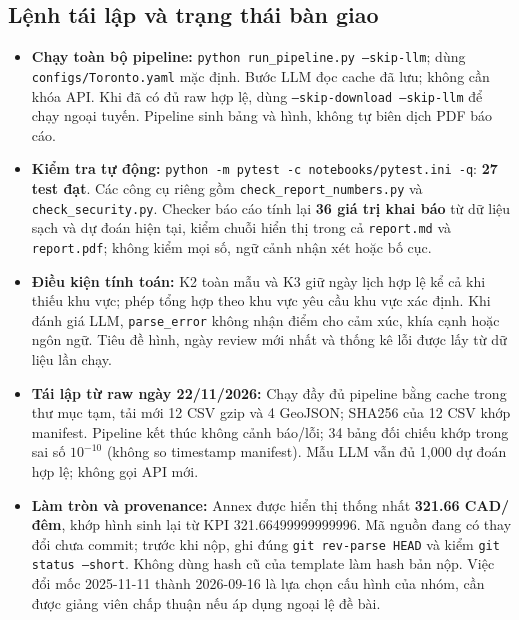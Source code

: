 \clearpage
\subsection{Lệnh tái lập và trạng thái bàn giao}

\begin{itemize}
\item \textbf{Chạy toàn bộ pipeline:} \texttt{python run\_pipeline.py --skip-llm}; dùng \texttt{configs/Toronto.yaml} mặc định. Bước LLM đọc cache đã lưu; không cần khóa API. Khi đã có đủ raw hợp lệ, dùng \texttt{--skip-download --skip-llm} để chạy ngoại tuyến. Pipeline sinh bảng và hình, không tự biên dịch PDF báo cáo.
\item \textbf{Kiểm tra tự động:} \texttt{python -m pytest -c notebooks/pytest.ini -q}: \textbf{27 test đạt}. Các công cụ riêng gồm \texttt{check\_report\_numbers.py} và \texttt{check\_security.py}. Checker báo cáo tính lại \textbf{36 giá trị khai báo} từ dữ liệu sạch và dự đoán hiện tại, kiểm chuỗi hiển thị trong cả \texttt{report.md} và \texttt{report.pdf}; không kiểm mọi số, ngữ cảnh nhận xét hoặc bố cục.
\item \textbf{Điều kiện tính toán:} K2 toàn mẫu và K3 giữ ngày lịch hợp lệ kể cả khi thiếu khu vực; phép tổng hợp theo khu vực yêu cầu khu vực xác định. Khi đánh giá LLM, \texttt{parse\_error} không nhận điểm cho cảm xúc, khía cạnh hoặc ngôn ngữ. Tiêu đề hình, ngày review mới nhất và thống kê lỗi được lấy từ dữ liệu lần chạy.
\item \textbf{Tái lập từ raw ngày 22/11/2026:} Chạy đầy đủ pipeline bằng cache trong thư mục tạm, tải mới 12 CSV gzip và 4 GeoJSON; SHA256 của 12 CSV khớp manifest. Pipeline kết thúc không cảnh báo/lỗi; 34 bảng đối chiếu khớp trong sai số $10^{-10}$ (không so timestamp manifest). Mẫu LLM vẫn đủ 1,000 dự đoán hợp lệ; không gọi API mới.
\item \textbf{Làm tròn và provenance:} Annex được hiển thị thống nhất \textbf{321.66 CAD/đêm}, khớp hình sinh lại từ KPI 321.66499999999996. Mã nguồn đang có thay đổi chưa commit; trước khi nộp, ghi đúng \texttt{git rev-parse HEAD} và kiểm \texttt{git status --short}. Không dùng hash cũ của template làm hash bản nộp. Việc đổi mốc 2025-11-11 thành 2026-09-16 là lựa chọn cấu hình của nhóm, cần được giảng viên chấp thuận nếu áp dụng ngoại lệ đề bài.
\end{itemize}
